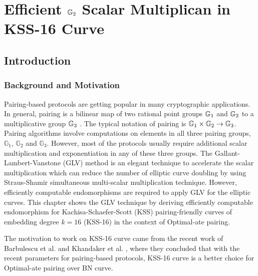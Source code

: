 \chapter{Efficient \texorpdfstring{${\mathbb{G}}_{2}$}{G2} Scalar Multiplican in KSS-16 Curve} 
\label{ch:candar2018}



\section{Introduction}
\subsection{Background and Motivation}
Pairing-based protocols are getting popular in many cryptographic applications. 
In general, pairing is a bilinear map of two rational point groups ${\mathbb{G}}_{1}$ and ${\mathbb{G}}_{2}$ to a multiplicative group ${\mathbb{G}}_{3}$ \cite{Silverman}.
The typical notation of pairing is ${\mathbb{G}}_{1} \times {\mathbb{G}}_{2} \rightarrow {\mathbb{G}}_{3}$.
Pairing algorithms involve computations on elements in all three pairing groups, $\mathbb{G}_1$, $\mathbb{G}_2$ and $\mathbb{G}_3$.
However, most of the protocols usually require additional scalar multiplication and exponentiation in any of these three groups. 
The Gallant-Lambert-Vanstone (GLV) method is an elegant technique to accelerate the scalar multiplication which can reduce the number of elliptic curve doubling by using Straus-Shamir simultaneous multi-scalar multiplication technique.
However, efficiently computable endomorphisms are required to apply GLV for the elliptic curves. 
This chapter shows the GLV technique by deriving efficiently computable endomorphism for Kachisa-Schaefer-Scott (KSS)  \cite{EPRINT:KacSchSco07} pairing-friendly curves of embedding degree $k=16$ (KSS-16) in the context of Optimal-ate pairing.


The motivation to work on KSS-16 curve came from the recent work of Barbulescu et al. \cite{EPRINT:BarDuq17} and Khandaker et al. \cite{INDOCRYPT:KNGDNK17}, where they concluded that with the recent parameters for pairing-based protocols, KSS-16 curve is a better choice for Optimal-ate pairing over BN curve.

